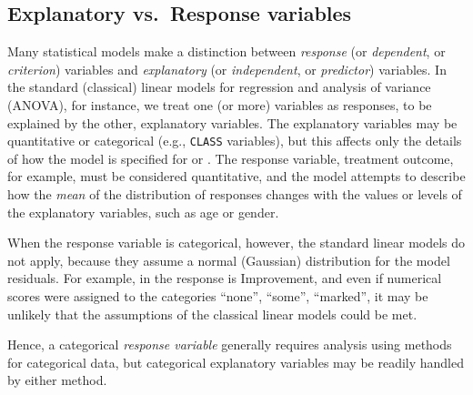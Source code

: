 \subsection{Explanatory vs.\ Response variables}
Many statistical models make a distinction between \emph{response}
(or \emph{dependent}, or \emph{criterion})
variables and
\emph{explanatory}
(or \emph{independent}, or \emph{predictor})
variables.
In the standard (classical) linear models for regression and analysis of variance
(ANOVA), for instance, we treat one (or more) variables as responses,
to be explained by the other, explanatory variables.
The explanatory variables may be quantitative or categorical
(e.g., \texttt{CLASS} variables), but
this affects only the details of how the model is specified for
 or .
The response variable, treatment outcome, for example, must be
considered quantitative,  and the model attempts to describe how the
\emph{mean} of the distribution of responses changes with the values
or levels of the explanatory variables, such as age or gender.


When the response variable is categorical, however, the standard linear
models do not apply, because they assume a normal (Gaussian) distribution
for the model residuals.  For example, in  
the response is Improvement, and even if numerical scores were assigned
to the categories ``none'', ``some'', ``marked'', it may be unlikely
that the assumptions of the classical linear models could be met.

Hence, a categorical \emph{response variable} generally requires analysis
using methods for categorical data, but categorical explanatory variables
may be readily handled by either method.
